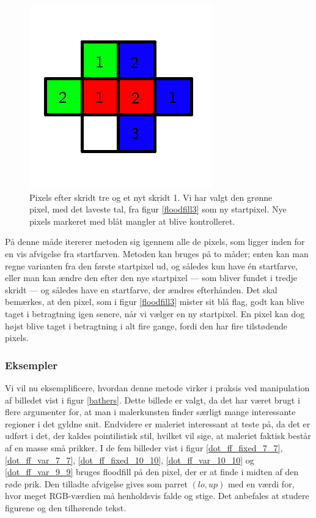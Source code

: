 {\begin{figure}[!h]
    \begin{center}
        \includegraphics[scale=0.42,angle=0]{afsnit/vores_implementation/billeder/flood_fill/floodfill4}
    \end{center}
    \caption[]{Pixels efter skridt tre og et nyt skridt 1. Vi har valgt
    den grønne pixel, med det laveste tal, fra figur \ref{floodfill3} som
    ny startpixel. Nye pixels markeret med blåt mangler at blive
    kontrolleret.}
    \label{floodfill4}
\end{figure}

På denne måde itererer metoden sig igennem alle de pixels, som ligger
inden for en vis afvigelse fra startfarven. Metoden kan bruges på to
måder; enten kan man regne varianten fra den første startpixel ud, og
således kun have én startfarve, eller man kan ændre den efter den nye
startpixel --- som bliver fundet i tredje skridt --- og således have en
startfarve, der ændres efterhånden. Det skal bemærkes, at den pixel, som
i figur \ref{floodfill3} mister sit blå flag, godt kan blive taget i
betragtning igen senere, når vi vælger en ny startpixel. En pixel kan
dog højst blive taget i betragtning i alt fire gange, fordi den har fire
tilstødende pixels.

\subsubsection{Eksempler}
Vi vil nu eksemplificere, hvordan denne metode virker i praksis ved
manipulation af billedet vist i figur \ref{bathers}.  Dette billede er
valgt, da det har været brugt i flere argumenter for, at man i
malerkunsten finder særligt mange interessante regioner i det gyldne
snit\cite{GoldenNumber,RatioArt}. Endvidere er maleriet
interessant at teste på, da det er udført i det, der kaldes
pointilistisk stil, hvilket vil sige, at maleriet faktisk består af en
masse små prikker. I de fem billeder vist i figur
\ref{dot_ff_fixed_7_7}, \ref{dot_ff_var_7_7}, \ref{dot_ff_fixed_10_10},
\ref{dot_ff_var_10_10} og \ref{dot_ff_var_9_9} bruges floodfill på den
pixel, der er at finde i midten af den røde prik. Den tilladte afvigelse
gives som parret $(lo, up)$ med en værdi for, hvor meget RGB-værdien må
henholdsvis falde og stige. Det anbefales at studere figurene og den
tilhørende tekst.

}
